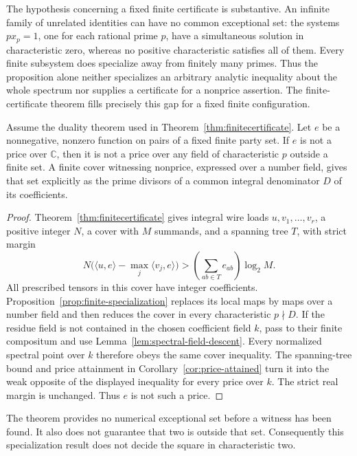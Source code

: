 The hypothesis concerning a fixed finite certificate is
substantive.  An infinite family of unrelated identities
can have no common exceptional set: the systems $p x_p=1$,
one for each rational prime $p$, have a simultaneous
solution in characteristic zero, whereas no positive
characteristic satisfies all of them.  Every finite
subsystem does specialize away from finitely many primes.
Thus the proposition alone neither specializes an
arbitrary analytic inequality about the whole spectrum
nor supplies a certificate for a nonprice assertion.
The finite-certificate theorem fills precisely this gap
for a fixed finite configuration.

\begin{theorem}
\label{thm:nonprice-specializes}
Assume the duality theorem used in
Theorem~\ref{thm:finitecertificate}.  Let $e$ be a
nonnegative, nonzero function on pairs of a fixed
finite party set.  If $e$ is not a price over
$\mathbb C$, then it is not a price over any field
of characteristic $p$ outside a finite set.  A
finite cover witnessing nonprice, expressed over
a number field, gives that set explicitly as
the prime divisors of a common integral
denominator $D$ of its coefficients.
\end{theorem}

\begin{proof}
Theorem~\ref{thm:finitecertificate} gives integral
wire loads $u,v_1,\ldots,v_r$, a positive integer
$N$, a cover with $M$ summands, and a spanning
tree $T$, with strict margin
\[
 N\bigl(\langle u,e\rangle-
           \max_j\langle v_j,e\rangle\bigr)
   >\left(\sum_{ab\in T}e_{ab}\right)\log_2 M.
\]
All prescribed tensors in this cover have
integer coefficients.  Proposition~\ref{prop:finite-specialization}
replaces its local maps by maps over a number
field and then reduces the cover in every
characteristic $p\nmid D$.  If the residue
field is not contained in the chosen
coefficient field $k$, pass to their finite
compositum and use
Lemma~\ref{lem:spectral-field-descent}.
Every normalized spectral point over $k$
therefore obeys the same cover inequality.
The spanning-tree bound and price attainment
in Corollary~\ref{cor:price-attained} turn it
into the weak opposite of the displayed
inequality for every price over $k$.
The strict real margin is unchanged.  Thus
$e$ is not such a price.
\end{proof}

The theorem provides no numerical exceptional
set before a witness has been found.  It also
does not guarantee that two is outside that
set.  Consequently this specialization result
does not decide the square in characteristic
two.

